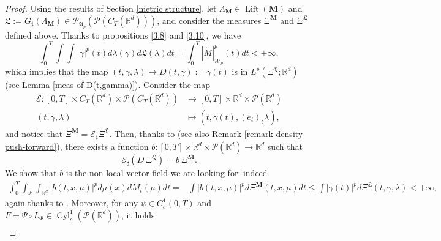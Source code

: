 \documentclass[10pt,leqno]{amsart}
\numberwithin{equation}{section}
\newcommand{\R}{\mathbb{R}}
\newcommand{\PP}{\mathcal{P}}
\begin{document}
\begin{proof}
    Using the results of Section \ref{metric structure}, let $\Lambda_{\boldsymbol{M}} \in \operatorname{Lift}(\boldsymbol{M})$ and $\mathfrak{L} := G_\sharp (\Lambda_{\boldsymbol{M}}) \in \PP_{\bar{\mathfrak{A}}_p}(\PP(C_T(\R^d)))$, and consider the measures $\Xi^{\boldsymbol{M}}$ and $\Xi^{\mathfrak{L}}$ defined above. Thanks to propositions \ref{3.8} and \ref{3.10}, we have 
    \[\int_0^T \int \int |\dot\gamma|^p(t) d\lambda(\gamma) d\mathfrak{L}(\lambda) dt = \int_0^T|\dot{M}|_{\mathcal{W}_p}^p(t) dt <+\infty,\]
    which implies that the map $(t,\gamma,\lambda) \mapsto D(t,\gamma):=\dot\gamma(t)$ is in $L^p(\Xi^{\mathfrak{L}};\R^d)$ (see Lemma \ref{meas of D(t,gamma)}). Consider the map
    \begin{equation}\label{eq: def of mathcal E}
        \begin{aligned}
            \mathcal{E}: [0,T]\times C_T(\R^d) \times \PP(C_T(\R^d)) & \to [0,T]\times \R^d \times \PP(\R^d)
            \\
            (t,\gamma,\lambda) & \mapsto (t,\gamma(t), (e_t)_\sharp  \lambda),
        \end{aligned}
    \end{equation}
    and notice that $\Xi^{\boldsymbol{M}} = \mathcal{E}_\sharp  \Xi^{\mathfrak{L}}$. Then, thanks to \cite[Lemma 17.3]{ambrosio2021lectures} (see also  Remark \ref{remark density push-forward}), there exists a function $b:[0,T]\times \R^d \times \PP(\R^d) \to \R^d$ such that 
    \begin{equation}\label{eq: def of b thanks to lemma}
    \mathcal{E}_\sharp (D \ \Xi^{\mathfrak{L}}) = b \ \Xi^{\boldsymbol{M}}.
    \end{equation}
    We show that $b$ is the non-local vector field we are looking for: indeed 
    \begin{equation}\label{energy inequality vf}
    \begin{aligned}
        \int_0^T \int_\PP \int_{\R^d} |b(t,x,\mu)|^p d\mu(x) dM_t(\mu) dt 
        = & 
        \int  |b(t,x,\mu)|^pd\Xi^{\boldsymbol{M}}(t,x,\mu)dt 
        \leq 
        \int |\dot\gamma(t)|^p d\Xi^{\mathfrak{L}}(t,\gamma,\lambda) <+\infty,
    \end{aligned}
    \end{equation}
    again thanks to \cite[Lemma 17.3]{ambrosio2021lectures}. Moreover, for any $\psi\in C^1_c(0,T)$ and $F = \Psi\circ L_\Phi \in \operatorname{Cyl}_c^1(\PP(\R^d))$, it holds
    \begin{align*}

\end{align*}
\end{proof}
\end{document}
